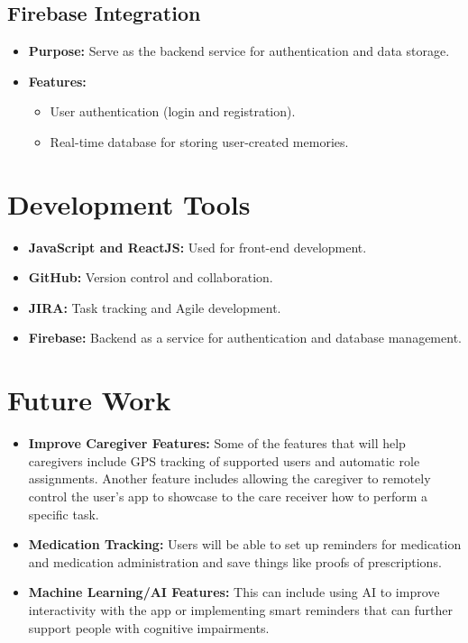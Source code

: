 \documentclass[12pt]{article}
\begin{document}
\subsection{Firebase Integration}
\begin{itemize}
    \item \textbf{Purpose:} Serve as the backend service for authentication and data storage.
    \item \textbf{Features:}
    \begin{itemize}
        \item User authentication (login and registration).
        \item Real-time database for storing user-created memories.
    \end{itemize}
\end{itemize}

\section{Development Tools}
\begin{itemize}
    \item \textbf{JavaScript and ReactJS:} Used for front-end development.
    \item \textbf{GitHub:} Version control and collaboration.
    \item \textbf{JIRA:} Task tracking and Agile development.
    \item \textbf{Firebase:} Backend as a service for authentication and database management.
\end{itemize}
\section{Future Work}
\begin{itemize}
    \item \textbf{Improve Caregiver Features:} Some of the features that will help caregivers include GPS tracking of supported users and automatic role assignments. Another feature includes allowing the caregiver to remotely control the user’s app to showcase to the care receiver how to perform a specific task.
    \item \textbf{Medication Tracking:} Users will be able to set up reminders for medication and medication administration and save things like proofs of prescriptions.
    \item \textbf{Machine Learning/AI Features:} This can include using AI to improve interactivity with the app or implementing smart reminders that can further support people with cognitive impairments.
\end{itemize}
\end{document}

